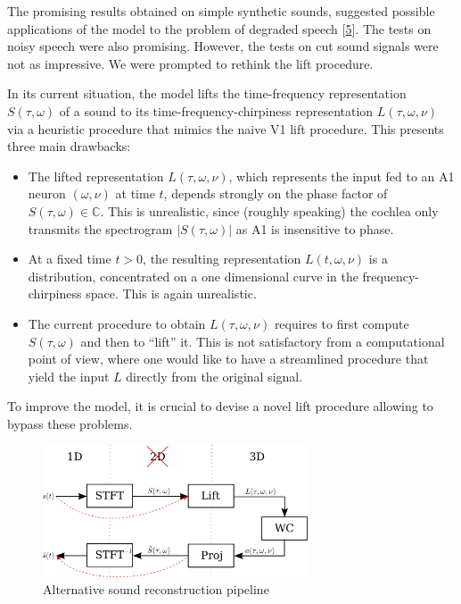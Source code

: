 \documentclass[american,]{article}
\providecommand{\tightlist}{%
  \setlength{\itemsep}{0pt}\setlength{\parskip}{0pt}}
\theoremstyle{definition}
\theoremstyle{definition}
\theoremstyle{definition}
\theoremstyle{remark}
\begin{document}
The promising results obtained on simple synthetic sounds,
suggested possible applications of the model to the problem
of degraded speech {[}\protect\hyperlink{ref-boscain2021}{5}{]}.
The tests on noisy speech were also promising.
However, the tests on cut sound signals were not as impressive.
We were prompted to rethink the lift procedure.

In its current situation, the model lifts the time-frequency representation \(S(\tau,\omega)\)
of a sound to its time-frequency-chirpiness representation \(L(\tau,\omega,\nu)\)
via a heuristic procedure that mimics the naive V1 lift procedure.
This presents three main drawbacks:

\begin{itemize}
\tightlist
\item
  The lifted representation \(L(\tau,\omega,\nu)\), which represents the input fed to an A1 neuron
  \((\omega,\nu)\) at time \(t\), depends strongly on the phase factor of \(S(\tau,\omega)\in\mathbb{C}\).
  This is unrealistic, since (roughly speaking) the cochlea only transmits the spectrogram
  \(\left\lvert S(\tau,\omega)\right\rvert\) as A1 is insensitive to phase.
\item
  At a fixed time \(t>0\), the resulting representation \(L(t,\omega,\nu)\) is a distribution,
  concentrated on a one dimensional curve in the frequency-chirpiness space.
  This is again unrealistic.
\item
  The current procedure to obtain \(L(\tau,\omega,\nu)\) requires to first compute \(S(\tau,\omega)\)
  and then to ``lift'' it.
  This is not satisfactory from a computational point of view, where one would like to have
  a streamlined procedure that yield the input \(L\) directly from the original signal.
\end{itemize}

To improve the model, it is crucial to devise a novel lift procedure allowing to bypass these problems.

\begin{figure}
\centering
\includegraphics[width=0.7\textwidth,height=\textheight]{img/new_pipeline.png}
\caption{Alternative sound reconstruction pipeline}
\end{figure}
\end{document}
